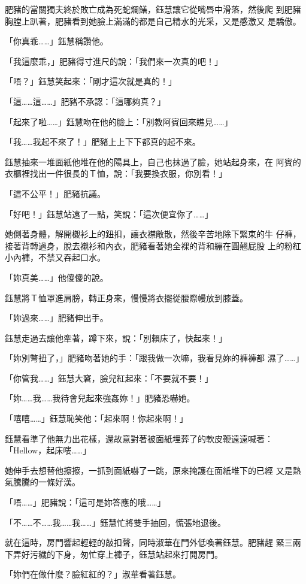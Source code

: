 肥豬的當關獨夫終於敗亡成為死蛇爛鱔，鈺慧讓它從嘴唇中滑落，然後爬
到肥豬胸膛上趴著，肥豬看到她臉上滿滿的都是自己精水的光采，又是感激又
是驕傲。

「你真乖……」鈺慧稱讚他。

「我這麼乖，」肥豬得寸進尺的說：「我們來一次真的吧！」

「唔？」鈺慧笑起來：「剛才這次就是真的！」

「這……這……」肥豬不承認：「這哪夠真？」

「起來了啦……」鈺慧吻在他的臉上：「別教阿賓回來瞧見……」

「我……我起不來了！」肥豬上上下下都真的起不來。

鈺慧抽來一堆面紙他堆在他的陽具上，自己也抹過了臉，她站起身來，在
阿賓的衣櫃裡找出一件很長的Ｔ恤，說：「我要換衣服，你別看！」

「這不公平！」肥豬抗議。

「好吧！」鈺慧站遠了一點，笑說：「這次便宜你了……」

她側著身體，解開櫬衫上的鈕扣，讓衣襟敞散，然後辛苦地除下緊束的牛
仔褲，接著背轉過身，脫去襯衫和內衣，肥豬看著她全裸的背和繃在圓翹屁股
上的粉紅小內褲，不禁又吞起口水。

「妳真美……」他傻傻的說。

鈺慧將Ｔ恤罩進肩膀，轉正身來，慢慢將衣擺從腰際幔放到膝蓋。

「妳過來……」肥豬伸出手。

鈺慧走過去讓他牽著，蹲下來，說：「別賴床了，快起來！」

「妳別彆扭了，」肥豬吻著她的手：「跟我做一次嘛，我看見妳的褲褲都
濕了……」

「你管我……」鈺慧大窘，臉兒紅起來：「不要就不要！」

「妳……我……我待會兒起來強姦妳！」肥豬恐嚇她。

「嘻嘻……」鈺慧恥笑他：「起來啊！你起來啊！」

鈺慧看準了他無力出花樣，還故意對著被面紙埋葬了的軟皮鞭遠遠喊著：
「Hellow，起床嘍……」

她伸手去想替他擦擦，一抓到面紙嚇了一跳，原來掩護在面紙堆下的已經
又是熱氣騰騰的一條好漢。

「唔……」肥豬說：「這可是妳答應的哦……」

「不……不……我……我……」鈺慧忙將雙手抽回，慌張地退後。

就在這時，房門響起輕輕的敲扣聲，同時淑華在門外低喚著鈺慧。肥豬趕
緊三兩下弄好污穢的下身，匆忙穿上褲子，鈺慧站起來打開房門。

「妳們在做什麼？臉紅紅的？」淑華看著鈺慧。

